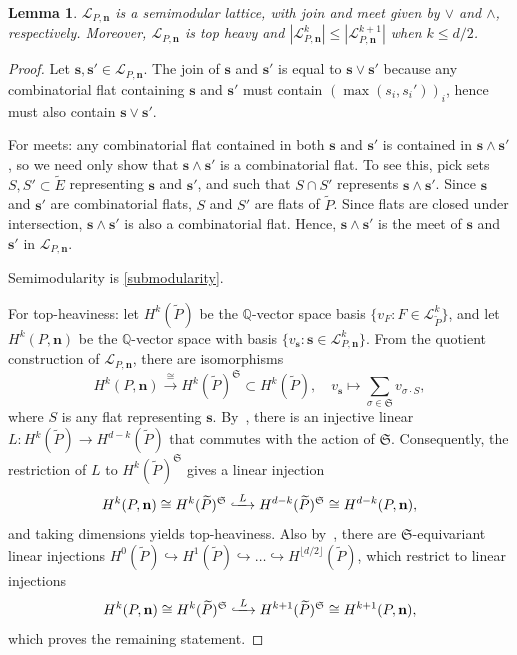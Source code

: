 \documentclass[11pt]{article}
\newtheorem{lemm}[theo]{Lemma}
\theoremstyle{definition}
\numberwithin{equation}{section}
\newcommand{\Q}{\mathbb{Q}}
\begin{document}
\begin{lemm}\label{lattice}
  $\mathcal L_{P, \mathbf n}$ is a semimodular lattice, with join and meet given by $\vee$ and $\wedge$, respectively. Moreover, $\mathcal L_{P, \mathbf n}$ is top heavy and $|\mathcal L_{P, \mathbf{n}}^k| \leq | \mathcal L_{P, \mathbf n}^{k+1}|$ when $k \leq d/2$.
\end{lemm}
\begin{proof}
  Let $\mathbf s, \mathbf s' \in \mathcal L_{P, \mathbf n}$.
  The join of $\mathbf s$ and $\mathbf s'$ is equal to $\mathbf s \vee \mathbf s'$ because any combinatorial flat containing $\mathbf s$ and $\mathbf s'$ must contain $(\max(s_i, s_i'))_i$, hence must also contain $\mathbf s \vee \mathbf s'$.

  For meets: any combinatorial flat contained in both $\mathbf s$ and $\mathbf s'$ is contained in $\mathbf s \wedge \mathbf s'$, so we need only show that $\mathbf s \wedge \mathbf s'$ is a combinatorial flat.
  To see this, pick sets $S, S' \subset \widetilde E$ representing $\mathbf s$ and $\mathbf s'$, and such that $S \cap S'$ represents $\mathbf s \wedge \mathbf s'$. Since $\mathbf s$ and $\mathbf s'$ are combinatorial flats, $S$ and $S'$ are flats of $\widetilde P$.
  Since flats are closed under intersection, $\mathbf s \wedge \mathbf s'$ is also a combinatorial flat.
  Hence, $\mathbf s \wedge \mathbf s'$ is the meet of $\mathbf s$ and $\mathbf s'$ in $\mathcal L_{P, \mathbf n}$.

  Semimodularity is \cref{submodularity}.

  For top-heaviness:
  let $H^k(\widetilde P)$ be the $\Q$-vector space basis $\{v_F : F \in \mathcal L_{\widetilde P}^k\}$, and let
  $H^k(P, \mathbf n)$ be the $\Q$-vector space with basis $\{v_{\mathbf s} : \mathbf s \in \mathcal L_{P, \mathbf n}^k\}$.
  From the quotient construction of $\mathcal L_{P, \mathbf n}$, there are isomorphisms
  \[
    H^k(P, \mathbf n) \overset{\cong}{\to} H^k(\widetilde P)^{\mathfrak S} \subset H^k(\widetilde P), \quad v_{\mathbf s} \mapsto \sum_{\sigma \in \mathfrak S} v_{\sigma \cdot S},
  \]
  where $S$ is any flat representing $\mathbf s$.
  By~\cite[Theorem 1.1]{BHMPW20b}, there is an injective linear $L: H^k(\widetilde P) \to H^{d-k}(\widetilde P)$ that commutes with the action of $\mathfrak S$. Consequently, the restriction of $L$ to $H^k(\widetilde P)^{\mathfrak S}$ gives a linear injection
  \[
    H^k(P, \mathbf n) \cong H^k(\widetilde P)^{\mathfrak S} \lhook\joinrel\xrightarrow{\;L\;} H^{d-k}(\widetilde P)^{\mathfrak S} \cong H^{d-k}(P, \mathbf n),
  \]
  and taking dimensions yields top-heaviness.
  Also by~\cite[Theorem 1.1]{BHMPW20b}, there are $\mathfrak S$-equivariant linear injections $H^0(\widetilde P) \hookrightarrow H^{1}(\widetilde P) \hookrightarrow \ldots \hookrightarrow H^{\lfloor d/2 \rfloor}(\widetilde P)$, which restrict to linear injections
  \[
    H^k(P, \mathbf n) \cong H^k(\widetilde P)^{\mathfrak S} \lhook\joinrel\xrightarrow{\;L\;} H^{k+1}(\widetilde P)^{\mathfrak S} \cong H^{k+1}(P, \mathbf n),
  \]
  which proves the remaining statement.
\end{proof}
\end{document}
